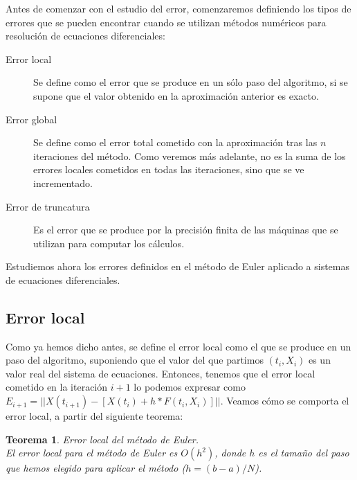 \documentclass[12pt]{article}       %
\newtheorem{theorem}{Teorema}
\begin{document}
Antes de comenzar con el estudio del error, comenzaremos definiendo los tipos de errores que se pueden encontrar cuando se utilizan métodos numéricos para resolución de ecuaciones diferenciales:

\begin{description}
\item[Error local] Se define como el error que se produce en un sólo paso del algoritmo, si se supone que el valor obtenido en la aproximación anterior es exacto.
\item[Error global] Se define como el error total cometido con la aproximación tras las $n$ iteraciones del método. Como veremos más adelante, no es la suma de los errores locales cometidos en todas las iteraciones, sino que se ve incrementado.
\item[Error de truncatura] Es el error que se produce por la precisión finita de las máquinas que se utilizan para computar los cálculos.
\end{description}

Estudiemos ahora los errores definidos en el método de Euler aplicado a sistemas de ecuaciones diferenciales.

\subsection{Error local}

Como ya hemos dicho antes, se define el error local como el que se produce en un paso del algoritmo, suponiendo que el valor del que partimos $(t_i, X_i)$ es un valor real del sistema de ecuaciones. Entonces, tenemos que el error local cometido en la iteración $i+1$ lo podemos expresar como $E_{i+1} = ||X(t_{i+1}) - [X(t_{i}) + h*F(t_i, X_i)] ||$. Veamos cómo se comporta el error local, a partir del siguiente teorema:

\begin{theorem} Error local del método de Euler.\\

El error local para el método de Euler es $O(h^2)$, donde $h$ es el tamaño del paso que hemos elegido para aplicar el método ($h=(b-a)/N$).

\end{theorem}
\end{document}
